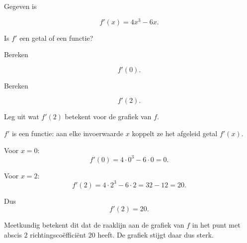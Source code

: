 \documentclass{ximera}
\begin{document}
\begin{oefening}{\oefB\ESS}

Gegeven is

\[
f'(x)=4x^3-6x.
\]

\begin{question}
Is $f'$ een getal of een functie?

\begin{multipleChoice}
\end{multipleChoice}
\end{question}

\begin{question}
Bereken

\[
f'(0).
\]
\end{question}

\begin{question}
Bereken

\[
f'(2).
\]
\end{question}

\begin{question}
Leg uit wat $f'(2)$ betekent voor de grafiek van $f$.
\end{question}

\begin{oplossing}

$f'$ is een functie: aan elke invoerwaarde $x$ koppelt ze het afgeleid getal
$f'(x)$.

Voor $x=0$:
\[
f'(0)=4\cdot0^3-6\cdot0=0.
\]

Voor $x=2$:
\[
f'(2)=4\cdot2^3-6\cdot2=32-12=20.
\]

Dus
\[
\boxed{f'(2)=20}.
\]

Meetkundig betekent dit dat de raaklijn aan de grafiek van $f$ in het punt
met abscis $2$ richtingscoëfficiënt $20$ heeft. De grafiek stijgt daar dus
sterk.

\end{oplossing}

\end{oefening}


\end{document}
